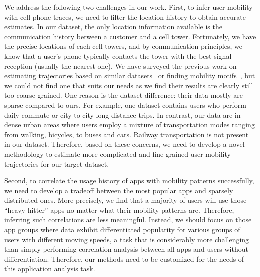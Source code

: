 We address the following two challenges in our work.
First, to infer user mobility with cell-phone traces,
we need to filter the location history to obtain accurate estimates. In our dataset, the only location information available is the communication history between a customer and a cell tower. Fortunately, we have the precise locations of each cell towers, and by communication principles, we know that a user's phone typically contacts the tower with the best signal reception (usually the nearest one). We have surveyed the previous work on estimating trajectories based on similar datasets~\cite{smoreda2013spatiotemporal, hoteit2014estimating, widhalm2015discovering, Alsolami2012Auth, jiang2013review} or finding mobility motifs~\cite{wang2014mobile, gambs2012next}, but we could not find one that suits our needs as we find their results are clearly still too coarse-grained. One reason is the dataset difference: their data mostly are sparse compared to ours. For example, one dataset contains users who perform daily commute or city to city long distance trips. In contrast, our data are in dense urban areas where users employ a mixture of transportation modes ranging from walking, bicycles, to buses and cars. Railway transportation is not present in our dataset. Therefore, based on these concerns, we need to develop a novel methodology to estimate more complicated and fine-grained user mobility trajectories for our target dataset.

Second, to correlate the usage history of apps with mobility patterns successfully, we need to develop a tradeoff between the most popular apps and sparsely distributed ones. More precisely, we find that a majority of users will use those ``heavy-hitter'' apps no matter what their mobility patterns are. Therefore, inferring such correlations are less meaningful. Instead, we should focus on those app groups where data exhibit differentiated popularity for various groups of users with different moving speeds, a task that is considerably more challenging than simply performing correlation analysis between all apps and users without differentiation. Therefore, our methods need to be customized for the needs of this application analysis task.

